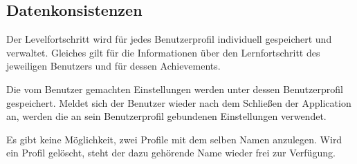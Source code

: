 \subsection{Datenkonsistenzen}

\begin{requirements}
  		
  	 Der Levelfortschritt wird für jedes Benutzerprofil individuell gespeichert und verwaltet. Gleiches gilt für die Informationen über den Lernfortschritt des jeweiligen Benutzers und für dessen Achievements.
  		
	 Die vom Benutzer gemachten Einstellungen werden unter dessen Benutzerprofil gespeichert. Meldet sich der Benutzer wieder nach dem Schließen der Application an, werden die an sein Benutzerprofil gebundenen Einstellungen verwendet.
	
	 Es gibt keine Möglichkeit, zwei Profile mit dem selben Namen anzulegen. Wird ein Profil gelöscht, steht der dazu gehörende Name wieder frei zur Verfügung.

\end{requirements}	
  		
